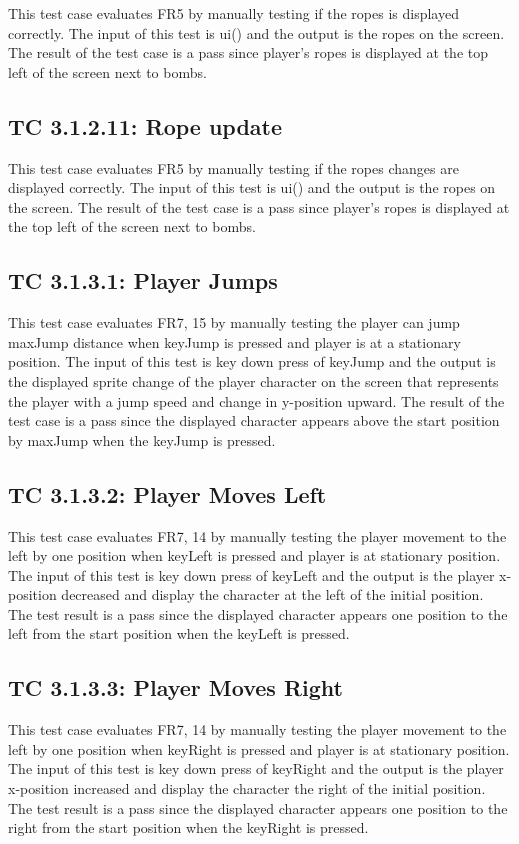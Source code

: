 \documentclass[12pt, titlepage]{article}
\begin{document}
This test case evaluates FR5 by manually testing if the ropes is displayed correctly. The input of this test is ui() and the output is the ropes on the screen. The result of the test case is a pass since player's ropes is displayed at the top left of the screen next to bombs.

\subsection*{TC 3.1.2.11: Rope update}

This test case evaluates FR5 by manually testing if the ropes changes are displayed correctly. The input of this test is ui() and the output is the ropes on the screen. The result of the test case is a pass since player's ropes is displayed at the top left of the screen next to bombs.

\subsection*{TC 3.1.3.1: Player Jumps}
This test case evaluates FR7, 15 by manually testing the player can jump maxJump distance when keyJump is pressed and player is at a stationary position. The input of this test is key down press of keyJump and the output is the displayed sprite change of the player character on the screen that represents the player with a jump speed and change in y-position upward. The result of the test case is a pass since the displayed character appears above the start position by maxJump when the keyJump is pressed. 

\subsection*{TC 3.1.3.2: Player Moves Left}
This test case evaluates FR7, 14 by manually testing the player movement to the left by one position when keyLeft is pressed and player is at stationary position. The input of this test is key down press of keyLeft and the output is the player x-position decreased and display the character at the left of the initial position. The test result is a pass since the displayed character appears one position to the left from the start position when the keyLeft is pressed. 

\subsection*{TC 3.1.3.3: Player Moves Right}
This test case evaluates FR7, 14 by manually testing the player movement to the left by one position when keyRight is pressed and player is at stationary position. The input of this test is key down press of keyRight and the output is the player x-position increased and display the character the right of the initial position. The test result is a pass since the displayed character appears one position to the right from the start position when the keyRight is pressed.
\end{document}
